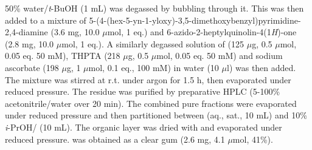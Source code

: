 50\% water/\textit{t}-BuOH (1 mL) was degassed by bubbling  through it. This was then added to a mixture of 5-(4-(hex-5-yn-1-yloxy)-3,5-dimethoxybenzyl)pyrimidine-2,4-diamine  (3.6 mg, 10.0 $\mu$mol, 1 eq.) and 6-azido-2-heptylquinolin-4(1\textit{H})-one  (2.8 mg, 10.0 $\mu$mol, 1 eq.).
A similarly degassed solution of 
 (125 $\mu$g, 0.5 $\mu$mol, 0.05 eq. 50 mM), 
THPTA (218 $\mu$g, 0.5 $\mu$mol, 0.05 eq. 50 mM) and 
sodium ascorbate (198 $\mu$g, 1 $\mu$mol, 0.1 eq., 100 mM) in water (10 $\mu$l) was then added. 
The mixture was stirred at r.t. under argon for 1.5 h, then evaporated under reduced pressure. The residue was purified by preparative HPLC (5-100\% acetonitrile/water over 20 min).
The combined pure fractions were evaporated under reduced pressure and then partitioned between  (aq., sat., 10 mL) and 10\% \textit{i}-PrOH/ (10 mL). The organic layer was dried with  and evaporated under reduced pressure.
 was obtained as a clear gum (2.6 mg, 4.1 $\mu$mol, 41\%).
\\[1\baselineskip]
\\[1\baselineskip]
\\[1\baselineskip]
